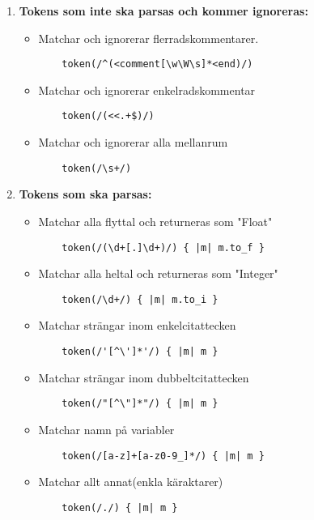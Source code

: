 \documentclass{TDP019mall}
\begin{document}
\begin{enumerate}

\item \textbf{Tokens som inte ska parsas och kommer ignoreras:}
\begin{itemize}

\item Matchar och ignorerar flerradskommentarer.
\begin{verbatim}
    token(/^(<comment[\w\W\s]*<end)/)
\end{verbatim}
\item Matchar och ignorerar enkelradskommentar
\begin{verbatim}
    token(/(<<.+$)/)
\end{verbatim}
\item Matchar och ignorerar alla mellanrum
\begin{verbatim}
    token(/\s+/)
\end{verbatim}
\end{itemize}

\item \textbf{Tokens som ska parsas:}
\begin{itemize}
\item Matchar alla flyttal och returneras som "Float"
\begin{verbatim}
    token(/(\d+[.]\d+)/) { |m| m.to_f }
\end{verbatim}
\item Matchar alla heltal och returneras som "Integer"
\begin{verbatim}
    token(/\d+/) { |m| m.to_i }
\end{verbatim}
\item Matchar strängar inom enkelcitattecken
\begin{verbatim}
    token(/'[^\']*'/) { |m| m } 
\end{verbatim}
\item Matchar strängar inom dubbeltcitattecken
\begin{verbatim}
    token(/"[^\"]*"/) { |m| m }
\end{verbatim}
\item Matchar namn på variabler
\begin{verbatim}
    token(/[a-z]+[a-z0-9_]*/) { |m| m }
\end{verbatim}
\item Matchar allt annat(enkla käraktarer)
\begin{verbatim}
    token(/./) { |m| m } 
\end{verbatim}
\end{itemize}
\end{enumerate}
\end{document}
